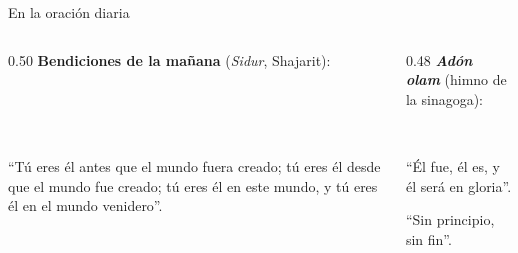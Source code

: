 \begin{frame}{En la oración diaria}
\begin{columns}[t,onlytextwidth]
\begin{column}{0.50\textwidth}\small
\textbf{Bendiciones de la mañana} (\emph{Sidur}, Shajarit):
\begin{center}\\ \\ \\ \end{center}
``Tú eres él antes que el mundo fuera creado; tú eres él desde que el mundo fue creado; tú eres él en este mundo, y tú eres él en el mundo venidero''.
\end{column}
\begin{column}{0.48\textwidth}\small
\textbf{\emph{Adón olam}} (himno de la sinagoga):
\begin{center}\\ \end{center}
``Él fue, él es, y él será en gloria''.
\begin{center}\end{center}
``Sin principio, sin fin''.
\end{column}
\end{columns}\par\smallskip
{}
\end{frame}

